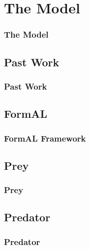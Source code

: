 \section{The Model}

\frame
{
	\frametitle{The Model}
}

\subsection{Past Work}

\frame
{
	\frametitle{Past Work}
}

\subsection{FormAL}

\frame
{
	\frametitle{FormAL Framework}
}

\subsection{Prey}

\frame
{
	\frametitle{Prey}
}

\subsection{Predator}

\frame
{
	\frametitle{Predator}
}